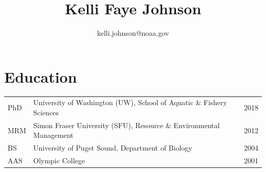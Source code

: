 \documentclass[10pt]{article}
\title{\bfseries\Huge Kelli Faye Johnson}
\author{kelli.johnson@noaa.gov}
\date{}
\begin{document}

\maketitle
\vspace{-15mm}
\noindent\makebox[\linewidth]{\rule{\paperwidth}{0.4pt}}
\section*{Education}
\begin{tabular}{lll}
PhD & University of Washington (UW), School of Aquatic \& Fishery Sciences & 2018 \\
MRM & Simon Fraser University (SFU), Resource \& Environmental Management & 2012 \\
BS & University of Puget Sound, Department of Biology & 2004 \\
AAS & Olympic College & 2001 \\
\end{tabular}
\end{document}
